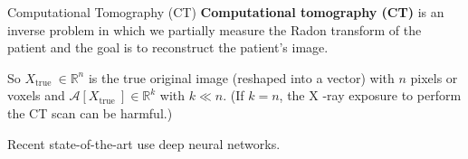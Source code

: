 \begin{frame}[allowframebreaks]

\begin{mydefinitionblock}{8.28}{Computational Tomography (CT)}
    \textbf{Computational tomography (CT)} is an inverse problem in which we partially measure the Radon transform of the patient and the goal is to reconstruct the patient's image.

    So $X_{\text {true }} \in \mathbb{R}^{n}$ is the true original image (reshaped into a vector) with $n$ pixels or voxels and $\mathcal{A}\left[X_{\text {true }}\right] \in \mathbb{R}^{k}$ with $k \ll n$. (If $k=n$, the X -ray exposure to perform the CT scan can be harmful.)

    Recent state-of-the-art use deep neural networks.
\end{mydefinitionblock}

\end{frame}

